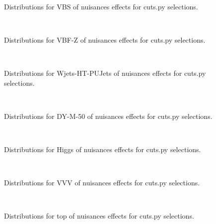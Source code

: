 


\begin{figure}[htbp]  
\centering 
\\ 
\caption{ 
   Distributions for VBS of nuisances effects for cuts.py selections.
} 
\label{fig:VBS_cuts.py} 
\end{figure} 




\begin{figure}[htbp]  
\centering 
\\ 
\caption{ 
   Distributions for VBF-Z of nuisances effects for cuts.py selections.
} 
\label{fig:VBF-Z_cuts.py} 
\end{figure} 




\begin{figure}[htbp]  
\centering 
\\ 
\caption{ 
   Distributions for Wjets-HT-PUJets of nuisances effects for cuts.py selections.
} 
\label{fig:Wjets_HT_PUJets_cuts.py} 
\end{figure} 




\begin{figure}[htbp]  
\centering 
\\ 
\caption{ 
   Distributions for DY-M-50 of nuisances effects for cuts.py selections.
} 
\label{fig:DY_M-50_cuts.py} 
\end{figure} 




\begin{figure}[htbp]  
\centering 
\\ 
\caption{ 
   Distributions for Higgs of nuisances effects for cuts.py selections.
} 
\label{fig:Higgs_cuts.py} 
\end{figure} 




\begin{figure}[htbp]  
\centering 
\\ 
\caption{ 
   Distributions for VVV of nuisances effects for cuts.py selections.
} 
\label{fig:VVV_cuts.py} 
\end{figure} 




\begin{figure}[htbp]  
\centering 
\\ 
\caption{ 
   Distributions for top of nuisances effects for cuts.py selections.
} 
\label{fig:top_cuts.py} 
\end{figure} 




